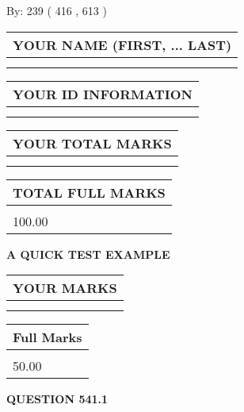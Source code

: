 \documentclass[12pt]{article}
\begin{document}
   
\hspace{1.0in} By: 
 239 ( 416 ,  613 )
   
   
   
   
\newpage 
\setcounter{page}{ 
   541001 } 
   
   
   
   
\noindent\begin{tabular}{|l|}
\hline
YOUR NAME (FIRST, ... LAST)  \\
\hline
 \\ 
 \\ 
\hline
\end{tabular}
\hspace{0.05in} \begin{tabular}{|l|}
\hline
 YOUR   ID   INFORMATION  \\
\hline
 \\ 
 \\ 
\hline
\end{tabular}
   
   
\vspace{0.2in}\noindent\begin{tabular}{|l|}
\hline
YOUR TOTAL MARKS  \\
\hline
 \\ 
 \\ 
\hline
\end{tabular}
\hspace{0.05in} \begin{tabular}{|l|}
\hline
TOTAL FULL MARKS  \\
\hline
 \\ 
100.00 \\
\hline
\end{tabular}
   
   
 \vspace{0.2in}
{\LARGE {\textbf{ A QUICK TEST EXAMPLE}}}
   
   
  
\vspace{0.2in}
  
\noindent\begin{tabular}{|l|}
\hline
 YOUR MARKS  \\
\hline
 \\ 
 \\ 
\hline
\end{tabular}
\hspace{0.05in} \begin{tabular}{|l|}
\hline
 Full Marks  \\
\hline
 \\ 
50.00 \\
\hline
\end{tabular}
{\textbf{\Large{QUESTION
541.1 
}}}
  
\end{document}
